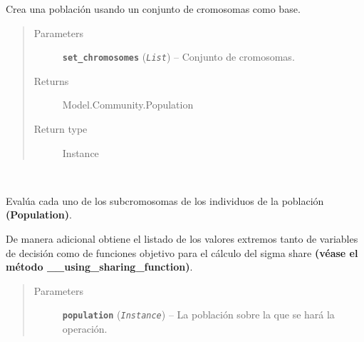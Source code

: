 \documentclass[letterpaper,10pt,english]{sphinxmanual}
\begin{document}
\begin{fulllineitems}

\begin{fulllineitems}
\label{Model/Community/Community:Model.Community.Community.Community.create_population}
Crea una población usando un conjunto de cromosomas como base.
\begin{quote}\begin{description}
\item[{Parameters}] \leavevmode
\textbf{\texttt{set\_chromosomes}} (\emph{\texttt{List}}) -- Conjunto de cromosomas.

\item[{Returns}] \leavevmode
Model.Community.Population

\item[{Return type}] \leavevmode
Instance

\end{description}\end{quote}

\end{fulllineitems}


\begin{fulllineitems}
\label{Model/Community/Community:Model.Community.Community.Community.evaluate_population_functions}~
\begin{DUlineblock}{0em}
\item[] Evalúa cada uno de los subcromosomas de los individuos de la 
población \textbf{(Population)}.
\item[] De manera adicional obtiene el listado de los valores extremos tanto
de variables de decisión como de funciones objetivo para el 
cálculo del sigma share \textbf{(véase el método \_\_using\_sharing\_function)}. 
\end{DUlineblock}
\begin{quote}\begin{description}
\item[{Parameters}] \leavevmode
\textbf{\texttt{population}} (\emph{\texttt{Instance}}) -- La población sobre la que se hará la operación.

\end{description}\end{quote}


\end{fulllineitems}
\end{fulllineitems}
\end{document}
